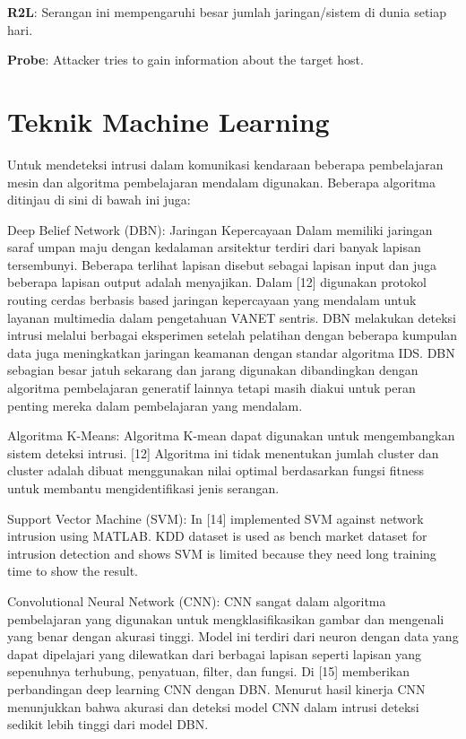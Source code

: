 \documentclass[conference]{IEEEtran}
\begin{document}
\textbf{R2L}: Serangan ini mempengaruhi besar jumlah jaringan/sistem di dunia setiap hari.

\textbf{Probe}: Attacker tries to gain information about 
the target host.

\section{Teknik Machine Learning}
Untuk mendeteksi intrusi dalam komunikasi kendaraan beberapa
pembelajaran mesin dan algoritma pembelajaran mendalam digunakan.
Beberapa algoritma ditinjau di sini di bawah ini juga:

Deep Belief Network (DBN): Jaringan Kepercayaan Dalam
memiliki jaringan saraf umpan maju dengan kedalaman
arsitektur terdiri dari banyak lapisan tersembunyi. Beberapa terlihat
lapisan disebut sebagai lapisan input dan juga beberapa lapisan output adalah
menyajikan. Dalam [12]\cite{olusola2010analysis} digunakan protokol routing cerdas berbasis based
jaringan kepercayaan yang mendalam untuk layanan multimedia dalam pengetahuan
VANET sentris. DBN melakukan deteksi intrusi
melalui berbagai eksperimen setelah pelatihan dengan beberapa
kumpulan data juga meningkatkan jaringan keamanan dengan standar
algoritma IDS. DBN sebagian besar jatuh sekarang dan
jarang digunakan dibandingkan dengan algoritma pembelajaran generatif lainnya
tetapi masih diakui untuk peran penting mereka dalam pembelajaran yang mendalam.

Algoritma K-Means: Algoritma K-mean dapat digunakan
untuk mengembangkan sistem deteksi intrusi. [12]\cite{zhang2018intelligent} Algoritma ini
tidak menentukan jumlah cluster dan cluster adalah
dibuat menggunakan nilai optimal berdasarkan fungsi fitness untuk
membantu mengidentifikasi jenis serangan.

Support Vector Machine (SVM): In [14]\cite{sukumar2018network} implemented 
SVM against network intrusion using MATLAB. KDD 
dataset is used as bench market dataset for intrusion 
detection and shows SVM is limited because they need long 
training time to show the result. 

Convolutional Neural Network (CNN): CNN sangat dalam
algoritma pembelajaran yang digunakan untuk mengklasifikasikan gambar dan mengenali
yang benar dengan akurasi tinggi. Model ini terdiri dari
neuron dengan data yang dapat dipelajari yang dilewatkan dari berbagai lapisan
seperti lapisan yang sepenuhnya terhubung, penyatuan, filter, dan fungsi. Di
[15]\cite{lahre2013analyze} memberikan perbandingan deep learning CNN dengan DBN.
Menurut hasil kinerja CNN menunjukkan bahwa
akurasi dan deteksi model CNN dalam intrusi
deteksi sedikit lebih tinggi dari model DBN.
\end{document}
